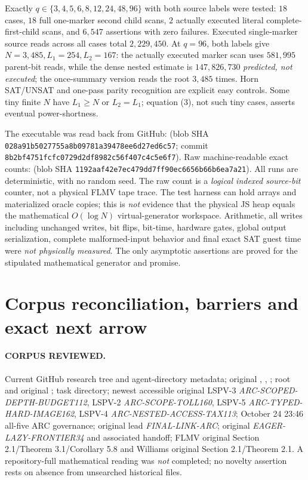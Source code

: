 \documentclass[11pt]{article}
\begin{document}
Exactly \(q\in\{3,4,5,6,8,12,24,48,96\}\)
with both source labels were tested:
\(18\) cases, \(18\) full one-marker second
child scans, \(2\) actually executed
literal complete-first-child scans, and
\(6{,}547\) assertions with zero failures.
Executed single-marker source reads across
all cases total \(2{,}229{,}450\).
At \(q=96\), both labels give
\(N=3{,}485,L_1=254,L_2=167\):
the actually executed marker scan uses
\(581{,}995\) parent-bit reads, while
the dense nested estimate is
\(147{,}826{,}730\) \emph{predicted,
not executed}; the once-summary version
reads the root \(3{,}485\) times.
Horn SAT/UNSAT and one-pass parity
recognition are explicit easy controls.
Some tiny finite \(N\) have \(L_1\ge N\)
or \(L_2=L_1\); equation (3), not
such tiny cases, asserts eventual
power-shortness.

The executable was read back from GitHub:
(blob SHA \texttt{028a91b5027755a8b09781a39478ee6d27ed6c57};
commit \texttt{8b2bf4751fcfc0729d2df8982c56f407c4c5e6f7}).
Raw machine-readable exact counts:
(blob SHA \texttt{1192aaf42e7ec479dd7ff90ec6656b66b6ea7a21}).
All runs are deterministic, with no random seed.
The raw count is a \emph{logical indexed source-bit}
counter, not a physical FLMV tape trace.
The test harness can hold arrays and materialized
oracle copies; this is \emph{not} evidence that
the physical JS heap equals the mathematical
\(O(\log N)\) virtual-generator workspace.
Arithmetic, all writes including unchanged
writes, bit flips, bit-time, hardware gates,
global output serialization, complete
malformed-input behavior and final exact
SAT guest time were \emph{not physically
measured}. The only asymptotic assertions
are proved for the stipulated mathematical
generator and promise.

\section{Corpus reconciliation, barriers and exact next arrow}
\paragraph{CORPUS REVIEWED.}
Current GitHub research tree and agent-directory
metadata; original ,
,
;
root  and original
; task directory;
newest accessible original LSPV-3
\emph{ARC-SCOPED-DEPTH-BUDGET112},
LSPV-2 \emph{ARC-SCOPE-TOLL160},
LSPV-5 \emph{ARC-TYPED-HARD-IMAGE162},
LSPV-4 \emph{ARC-NESTED-ACCESS-TAX113};
October 24 23:46 all-five ARC governance;
original lead \emph{FINAL-LINK-ARC};
original \emph{EAGER-LAZY-FRONTIER34}
and associated handoff; FLMV original
Section 2.1/Theorem 3.1/Corollary 5.8 and
Williams original Section 2.1/Theorem 2.1.
A repository-full mathematical reading
was \emph{not} completed; no novelty
assertion rests on absence from unsearched
historical files.
\end{document}
